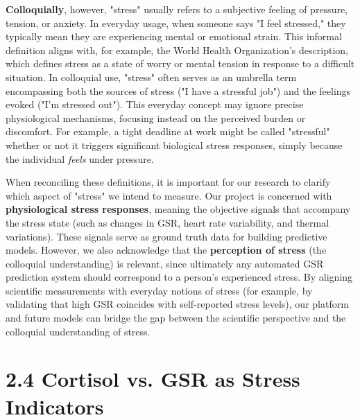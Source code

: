 \documentclass[11pt,a4paper]{report}
\begin{document}
\textbf{Colloquially}, however, "stress" usually refers to a subjective feeling of pressure, tension, or anxiety. In everyday usage, when someone says "I feel stressed," they typically mean they are experiencing mental or emotional strain. This informal definition aligns with, for example, the World Health Organization's description, which defines stress as a state of worry or mental tension in response to a difficult situation\cite{WHOStressDefinition}. In colloquial use, "stress" often serves as an umbrella term encompassing both the sources of stress ("I have a stressful job") and the feelings evoked ("I'm stressed out"). This everyday concept may ignore precise physiological mechanisms, focusing instead on the perceived burden or discomfort. For example, a tight deadline at work might be called "stressful" whether or not it triggers significant biological stress responses, simply because the individual \textit{feels} under pressure.

When reconciling these definitions, it is important for our research to clarify which aspect of "stress" we intend to measure. Our project is concerned with \textbf{physiological stress responses}, meaning the objective signals that accompany the stress state (such as changes in GSR, heart rate variability, and thermal variations). These signals serve as ground truth data for building predictive models. However, we also acknowledge that the \textbf{perception of stress} (the colloquial understanding) is relevant, since ultimately any automated GSR prediction system should correspond to a person's experienced stress. By aligning scientific measurements with everyday notions of stress (for example, by validating that high GSR coincides with self-reported stress levels), our platform and future models can bridge the gap between the scientific perspective and the colloquial understanding of stress.

\section{2.4 Cortisol vs. GSR as Stress Indicators}
\end{document}
